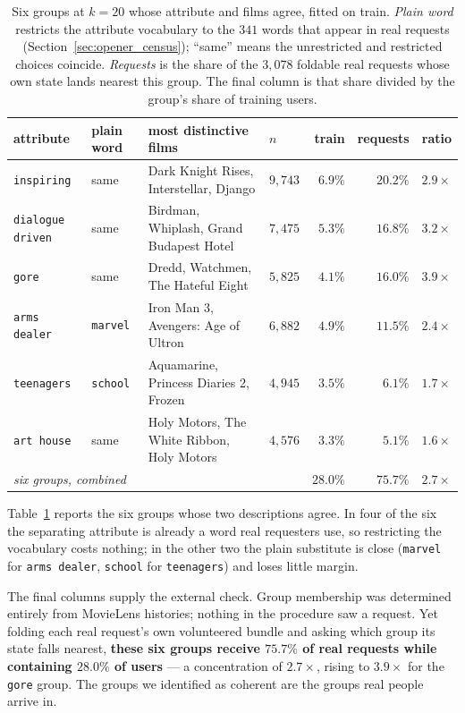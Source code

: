 \documentclass[11pt]{article}
\begin{document}
\begin{table}[t]
\centering
\caption{Six groups at $k{=}20$ whose attribute and films agree, fitted on train. \emph{Plain word}
restricts the attribute vocabulary to the $341$ words that appear in real requests
(Section~\ref{sec:opener_census}); ``same'' means the unrestricted and restricted choices coincide.
\emph{Requests} is the share of the $3{,}078$ foldable real requests whose own state lands nearest
this group. The final column is that share divided by the group's share of training users.}
\label{tab:clusters}
\footnotesize
\setlength{\tabcolsep}{4pt}
\begin{tabular}{llll rr r}
\toprule
attribute & plain word & most distinctive films & $n$ & train & requests & ratio \\
\midrule
\texttt{inspiring} & same & Dark Knight Rises, Interstellar, Django & $9{,}743$ & $6.9\%$ & $\mathbf{20.2\%}$ & $2.9\times$ \\
\texttt{dialogue driven} & same & Birdman, Whiplash, Grand Budapest Hotel & $7{,}475$ & $5.3\%$ & $\mathbf{16.8\%}$ & $3.2\times$ \\
\texttt{gore} & same & Dredd, Watchmen, The Hateful Eight & $5{,}825$ & $4.1\%$ & $\mathbf{16.0\%}$ & $3.9\times$ \\
\texttt{arms dealer} & \texttt{marvel} & Iron Man 3, Avengers: Age of Ultron & $6{,}882$ & $4.9\%$ & $11.5\%$ & $2.4\times$ \\
\texttt{teenagers} & \texttt{school} & Aquamarine, Princess Diaries 2, Frozen & $4{,}945$ & $3.5\%$ & $6.1\%$ & $1.7\times$ \\
\texttt{art house} & same & Holy Motors, The White Ribbon, Holy Motors & $4{,}576$ & $3.3\%$ & $5.1\%$ & $1.6\times$ \\
\midrule
\multicolumn{4}{l}{\emph{six groups, combined}} & $28.0\%$ & $\mathbf{75.7\%}$ & $2.7\times$ \\
\bottomrule
\end{tabular}
\end{table}

Table~\ref{tab:clusters} reports the six groups whose two descriptions agree. In four of the six the
separating attribute is already a word real requesters use, so restricting the vocabulary costs
nothing; in the other two the plain substitute is close (\texttt{marvel} for \texttt{arms dealer},
\texttt{school} for \texttt{teenagers}) and loses little margin.

The final columns supply the external check. Group membership was
determined entirely from MovieLens histories; nothing in the procedure saw a request. Yet folding
each real request's own volunteered bundle and asking which group its state falls nearest,
\textbf{these six groups receive $75.7\%$ of real requests while containing $28.0\%$ of users} --- a
concentration of $2.7\times$, rising to $3.9\times$ for the \texttt{gore} group. The groups we
identified as coherent are the groups real people arrive in.
\end{document}
